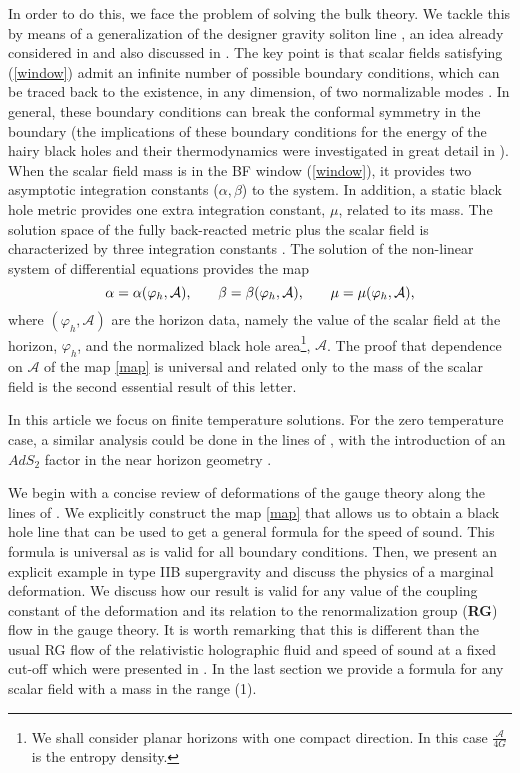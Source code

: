 \documentclass[11pt,epsf,letterpaper]{article}%
\begin{document}
In order to do this, we face the problem of solving the bulk theory. We tackle
this by means of a generalization of the designer gravity soliton line
\cite{Hertog:2004ns}, an idea already considered in \cite{Liu:2013gja} and
also discussed in \cite{Anabalon:2016yfg}. The key point is that scalar fields
satisfying (\ref{window}) admit an infinite number of possible boundary
conditions, which can be traced back to the existence, in any dimension, of
two normalizable modes \cite{Ishibashi:2004wx}. In general, these boundary
conditions can break the conformal symmetry in the boundary
\cite{Henneaux:2006hk} (the implications of these boundary conditions for the
energy of the hairy black holes and their thermodynamics were investigated in
great detail in \cite{Amsel:2006uf, Anabalon:2014fla}). When the scalar field
mass is in the BF window (\ref{window}), it provides two asymptotic
integration constants ($\alpha,\beta$) to the system. In addition, a static
black hole metric provides one extra integration constant, $\mu$, related to
its mass. The solution space of the fully back-reacted metric plus the scalar
field is characterized by three integration constants \cite{Liu:2015tqa}. The
solution of the non-linear system of differential equations provides the map%
\begin{equation}
\alpha=\alpha(\varphi_{h},\mathcal{A})\text{,\qquad}\beta=\beta(\varphi
_{h},\mathcal{A})\text{,\qquad}\mu=\mu(\varphi_{h},\mathcal{A})\text{,}
\label{map}%
\end{equation}
where $\left(  \varphi_{h},\mathcal{A}\right)  $ are the horizon data, namely
the value of the scalar field at the horizon, $\varphi_{h}$, and the
normalized black hole area\footnote{We shall consider planar horizons with one
compact direction. In this case $\frac{\mathcal{A}}{4G}$ is the entropy
density.}, $\mathcal{A}$. The proof that dependence on $\mathcal{A}$ of the
map \eqref{map} is universal and related only to the mass of the scalar field
is the second essential result of this letter.

In this article we focus on finite temperature solutions. For the zero
temperature case, a similar analysis could be done in the lines of
\cite{Anabalon:2013sra}, with the introduction of an $AdS_{2}$ factor in the
near horizon geometry \cite{Sen:2005wa, Sen:2007qy, Astefanesei:2006dd}.

We begin with a concise review of deformations of the gauge theory along the
lines of \cite{Witten:2001ua}. We explicitly construct the map \eqref{map}
that allows us to obtain a black hole line that can be used to get a general
formula for the speed of sound. This formula is universal as is valid for all
boundary conditions. Then, we present an explicit example in type IIB
supergravity and discuss the physics of a marginal deformation. We discuss how
our result is valid for any value of the coupling constant of the deformation
and its relation to the renormalization group (\textbf{RG}) flow in the gauge
theory. It is worth remarking that this is different than the usual RG flow of
the relativistic holographic fluid and speed of sound at a fixed cut-off which
were presented in \cite{Kuperstein:2011fn, Kuperstein:2013hqa}. In the last
section we provide a formula for any scalar field with a mass in the range (1).
\end{document}
